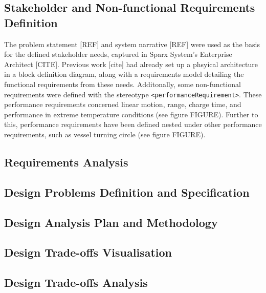 \documentclass[../main.tex]{subfiles}
\begin{document}
\subsection{Stakeholder and Non-functional Requirements Definition}
The problem statement [REF] and system narrative [REF] were used as the basis for the defined stakeholder needs, captured in Sparx System's Enterprise Architect [CITE].
Previous work [cite] had already set up a phsyical architecture in a block definition diagram, along with a requirements model detailing the functional requirements from these needs.
Additonally, some non-functional requirements were defined with the stereotype \texttt{<performanceRequirement>}.
These performance requirements concerned linear motion, range, charge time, and performance in extreme temperature conditions (see figure FIGURE).
Further to this, performance requirements have been defined nested under other performance requirements, such as vessel turning circle (see figure FIGURE).

\subsection{Requirements Analysis}

\subsection{Design Problems Definition and Specification}

\subsection{Design Analysis Plan and Methodology}

\subsection{Design Trade-offs Visualisation}

\subsection{Design Trade-offs Analysis}
\end{document}
